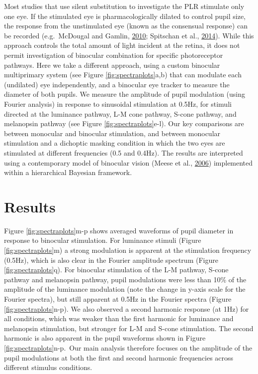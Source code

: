 \documentclass[
]{article}
\begin{document}
Most studies that use silent substitution to investigate the PLR stimulate only one eye. If the stimulated eye is pharmacologically dilated to control pupil size, the response from the unstimulated eye (known as the consensual response) can be recorded (e.g.~McDougal and Gamlin, \protect\hyperlink{ref-McDougal2010}{2010}; Spitschan et al., \protect\hyperlink{ref-Spitschan2014}{2014}). While this approach controls the total amount of light incident at the retina, it does not permit investigation of binocular combination for specific photoreceptor pathways. Here we take a different approach, using a custom binocular multiprimary system (see Figure \ref{fig:spectraplots}a,b) that can modulate each (undilated) eye independently, and a binocular eye tracker to measure the diameter of both pupils. We measure the amplitude of pupil modulation (using Fourier analysis) in response to sinusoidal stimulation at 0.5Hz, for stimuli directed at the luminance pathway, L-M cone pathway, S-cone pathway, and melanopsin pathway (see Figure \ref{fig:spectraplots}e-l). Our key comparisons are between monocular and binocular stimulation, and between monocular stimulation and a dichoptic masking condition in which the two eyes are stimulated at different frequencies (0.5 and 0.4Hz). The results are interpreted using a contemporary model of binocular vision (Meese et al., \protect\hyperlink{ref-Meese2006}{2006}) implemented within a hierarchical Bayesian framework.

\hypertarget{results}{%
\section{Results}\label{results}}

Figure \ref{fig:spectraplots}m-p shows averaged waveforms of pupil diameter in response to binocular stimulation. For luminance stimuli (Figure \ref{fig:spectraplots}m) a strong modulation is apparent at the stimulation frequency (0.5Hz), which is also clear in the Fourier amplitude spectrum (Figure \ref{fig:spectraplots}q). For binocular stimulation of the L-M pathway, S-cone pathway and melanopsin pathway, pupil modulations were less than 10\% of the amplitude of the luminance modulation (note the change in y-axis scale for the Fourier spectra), but still apparent at 0.5Hz in the Fourier spectra (Figure \ref{fig:spectraplots}n-p). We also observed a second harmonic response (at 1Hz) for all conditions, which was weaker than the first harmonic for luminance and melanopsin stimulation, but stronger for L-M and S-cone stimulation. The second harmonic is also apparent in the pupil waveforms shown in Figure \ref{fig:spectraplots}n-p.~Our main analysis therefore focuses on the amplitude of the pupil modulations at both the first and second harmonic frequencies across different stimulus conditions.
\end{document}
